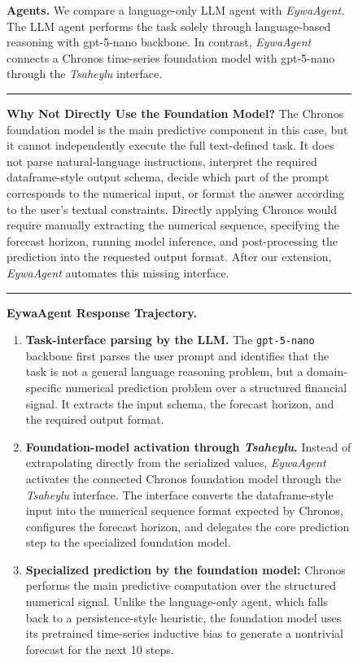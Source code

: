 \documentclass{llmxive}
\begin{document}
{\begin{figure}[!htbp]
{\begin{tcolorbox}
\vspace{3mm}
\textbf{Agents.}
We compare a language-only LLM agent with \textit{EywaAgent}. The LLM agent performs the task solely through language-based reasoning with gpt-5-nano backbone. In contrast, \textit{EywaAgent} connects a Chronos time-series foundation model with gpt-5-nano through the \textit{Tsaheylu} interface.

\vspace{3mm}
\hrule
\vspace{3mm}

\textbf{Why Not Directly Use the Foundation Model?}
The Chronos foundation model is the main predictive component in this case, but it cannot independently execute the full text-defined task. It does not parse natural-language instructions, interpret the required dataframe-style output schema, decide which part of the prompt corresponds to the numerical input, or format the answer according to the user's textual constraints. Directly applying Chronos would require manually extracting the numerical sequence, specifying the forecast horizon, running model inference, and post-processing the prediction into the requested output format. After our extension, \textit{EywaAgent} automates this missing interface.

\vspace{3mm}
\hrule
\vspace{3mm}

\textbf{EywaAgent Response Trajectory.}
\begin{enumerate}
    \item \textbf{Task-interface parsing by the LLM.} 
    The \texttt{gpt-5-nano} backbone first parses the user prompt and identifies that the task is not a general language reasoning problem, but a domain-specific numerical prediction problem over a structured financial signal. It extracts the input schema, the forecast horizon, and the required output format.

    \item \textbf{Foundation-model activation through \textit{Tsaheylu}.}
    Instead of extrapolating directly from the serialized values, \textit{EywaAgent} activates the connected Chronos foundation model through the \textit{Tsaheylu} interface. The interface converts the dataframe-style input into the numerical sequence format expected by Chronos, configures the forecast horizon, and delegates the core prediction step to the specialized foundation model.

    \item \textbf{Specialized prediction by the foundation model:}
    Chronos performs the main predictive computation over the structured numerical signal. Unlike the language-only agent, which falls back to a persistence-style heuristic, the foundation model uses its pretrained time-series inductive bias to generate a nontrivial forecast for the next 10 steps.


\end{enumerate}
\end{tcolorbox}}
\end{figure}}
\end{document}
